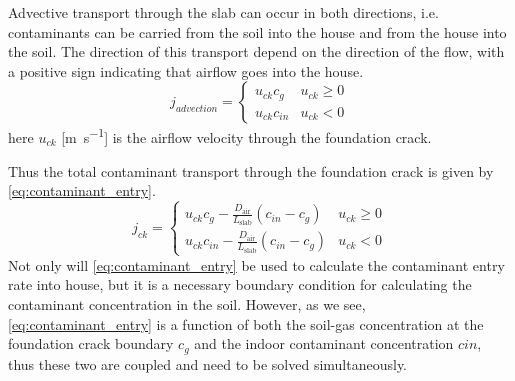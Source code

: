 Advective transport through the slab can occur in both directions, i.e. contaminants can be carried from the soil into the house and from the house into the soil\cite{holton_creation_2018}.
The direction of this transport depend on the direction of the flow, with a positive sign indicating that airflow goes into the house.
\begin{equation}
  j_{advection} = \begin{cases}
    u_{ck} c_g & u_{ck} \geq 0 \\
    u_{ck} c_{in} & u_{ck} < 0
\end{cases}
\end{equation}
here $u_{ck}$ [\si{\metre\per\second}] is the airflow velocity through the foundation crack.

Thus the total contaminant transport through the foundation crack is given by \eqref{eq:contaminant_entry}.
\begin{equation}\label{eq:contaminant_entry}
  j_{ck} = \begin{cases}
    u_{ck} c_g - \frac{D_\mathrm{air}}{L_\mathrm{slab}} (c_{in} - c_g) & u_{ck} \geq 0 \\
    u_{ck} c_{in} - \frac{D_\mathrm{air}}{L_\mathrm{slab}} (c_{in} - c_g) & u_{ck} < 0
\end{cases}
\end{equation}
Not only will \eqref{eq:contaminant_entry} be used to calculate the contaminant entry rate into house, but it is a necessary boundary condition for calculating the contaminant concentration in the soil.
However, as we see, \eqref{eq:contaminant_entry} is a function of both the soil-gas concentration at the foundation crack boundary $c_g$ and the indoor contaminant concentration $c{in}$, thus these two are coupled and need to be solved simultaneously.\par
